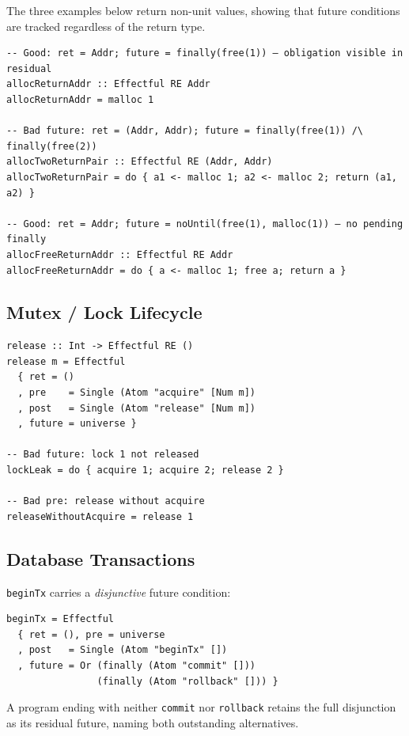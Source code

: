 \documentclass[acmsmall,screen]{acmart}
\begin{document}
The three examples below return non-unit values, showing that future
conditions are tracked regardless of the return type.

\begin{lstlisting}
-- Good: ret = Addr; future = finally(free(1)) — obligation visible in residual
allocReturnAddr :: Effectful RE Addr
allocReturnAddr = malloc 1

-- Bad future: ret = (Addr, Addr); future = finally(free(1)) /\ finally(free(2))
allocTwoReturnPair :: Effectful RE (Addr, Addr)
allocTwoReturnPair = do { a1 <- malloc 1; a2 <- malloc 2; return (a1, a2) }

-- Good: ret = Addr; future = noUntil(free(1), malloc(1)) — no pending finally
allocFreeReturnAddr :: Effectful RE Addr
allocFreeReturnAddr = do { a <- malloc 1; free a; return a }
\end{lstlisting}

\subsection{Mutex / Lock Lifecycle}

\begin{lstlisting}
release :: Int -> Effectful RE ()
release m = Effectful
  { ret = ()
  , pre    = Single (Atom "acquire" [Num m])
  , post   = Single (Atom "release" [Num m])
  , future = universe }

-- Bad future: lock 1 not released
lockLeak = do { acquire 1; acquire 2; release 2 }

-- Bad pre: release without acquire
releaseWithoutAcquire = release 1
\end{lstlisting}

\subsection{Database Transactions}

\lstinline{beginTx} carries a \emph{disjunctive} future condition:

\begin{lstlisting}
beginTx = Effectful
  { ret = (), pre = universe
  , post   = Single (Atom "beginTx" [])
  , future = Or (finally (Atom "commit" []))
                (finally (Atom "rollback" [])) }
\end{lstlisting}

A program ending with neither \lstinline{commit} nor \lstinline{rollback}
retains the full disjunction as its residual future, naming both
outstanding alternatives.
\end{document}
